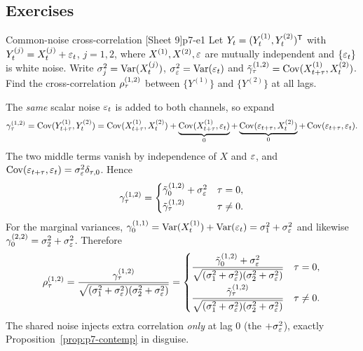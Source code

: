 \subsection{Exercises}

\begin{exercise}{Common-noise cross-correlation \quad\textnormal{[Sheet 9]}}{p7-e1}
Let $Y_t=(Y_t^{(1)},Y_t^{(2)})^{\mathsf{T}}$ with $Y_t^{(j)}=X_t^{(j)}+\varepsilon_t$, $j=1,2$,
where $X^{(1)},X^{(2)},\varepsilon$ are mutually independent and $\{\varepsilon_t\}$ is white
noise. Write $\sigma_j^2=\operatorname{Var}(X_t^{(j)})$, $\sigma_\varepsilon^2=\operatorname{Var}(\varepsilon_t)$ and
$\tilde{\gamma}_\tau^{(1,2)}=\operatorname{Cov}(X_{t+\tau}^{(1)},X_t^{(2)})$. Find the
cross-correlation $\rho_\tau^{(1,2)}$ between $\{Y^{(1)}\}$ and $\{Y^{(2)}\}$ at
all lags.
\end{exercise}
\begin{solution}
The \emph{same} scalar noise $\varepsilon_t$ is added to both channels, so expand
\[
\gamma_\tau^{(1,2)}=\operatorname{Cov}(Y_{t+\tau}^{(1)},Y_t^{(2)})
=\operatorname{Cov}(X_{t+\tau}^{(1)},X_t^{(2)})+\underbrace{\operatorname{Cov}(X_{t+\tau}^{(1)},\varepsilon_t)}_{0}
+\underbrace{\operatorname{Cov}(\varepsilon_{t+\tau},X_t^{(2)})}_{0}+\operatorname{Cov}(\varepsilon_{t+\tau},\varepsilon_t).
\]
The two middle terms vanish by independence of $X$ and $\varepsilon$, and
$\operatorname{Cov}(\varepsilon_{t+\tau},\varepsilon_t)=\sigma_\varepsilon^2\delta_{\tau,0}$. Hence
\[
\gamma_\tau^{(1,2)}=
\begin{cases}\tilde{\gamma}_0^{(1,2)}+\sigma_\varepsilon^2 & \tau=0,\\[2pt]
\tilde{\gamma}_\tau^{(1,2)} & \tau\ne0.\end{cases}
\]
For the marginal variances,
$\gamma_0^{(1,1)}=\operatorname{Var}(X_t^{(1)})+\operatorname{Var}(\varepsilon_t)=\sigma_1^2+\sigma_\varepsilon^2$ and
likewise $\gamma_0^{(2,2)}=\sigma_2^2+\sigma_\varepsilon^2$. Therefore
\[
\rho_\tau^{(1,2)}=\frac{\gamma_\tau^{(1,2)}}{\sqrt{(\sigma_1^2+\sigma_\varepsilon^2)(\sigma_2^2+\sigma_\varepsilon^2)}}
=
\begin{cases}
\dfrac{\tilde{\gamma}_0^{(1,2)}+\sigma_\varepsilon^2}{\sqrt{(\sigma_1^2+\sigma_\varepsilon^2)(\sigma_2^2+\sigma_\varepsilon^2)}} & \tau=0,\\[10pt]
\dfrac{\tilde{\gamma}_\tau^{(1,2)}}{\sqrt{(\sigma_1^2+\sigma_\varepsilon^2)(\sigma_2^2+\sigma_\varepsilon^2)}} & \tau\ne0.
\end{cases}
\]
The shared noise injects extra correlation \emph{only} at lag $0$ (the
$+\sigma_\varepsilon^2$), exactly Proposition~\ref{prop:p7-contemp} in disguise.
\end{solution}

